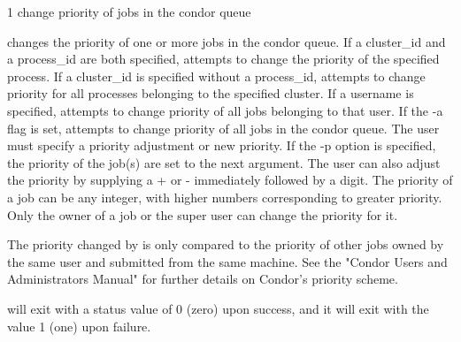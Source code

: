 \begin{ManPage}{\label{man-condor-prio}}{1}
{change priority of jobs in the condor queue} 
\Synopsis {}


\Description

 changes the priority of one or more jobs in the condor
queue.
If a cluster\_id and a process\_id are both specified, 
attempts to change the priority of the specified process.
If a cluster\_id is specified without a process\_id, 
attempts to change priority for all processes belonging to the
specified cluster.
If a username is specified,  attempts to change priority
of all jobs belonging to that user.
If the -a flag is set,  attempts to change priority of
all jobs in the condor queue.
The user must specify a priority adjustment or new priority. 
If the -p option is specified, the priority of the job(s) are set to
the next argument.
The user can also adjust the priority by supplying a + or -
immediately followed by a digit.
The priority of a job can be any integer, with higher numbers
corresponding to greater priority.
Only the owner of a job or the super user can change the priority for
it.

The priority changed by  is only compared to the priority
of other jobs owned by the same user and submitted from the same
machine.
See the "Condor Users and Administrators Manual" for further details
on Condor's priority scheme.

\begin{Options}
\end{Options}

\ExitStatus

 will exit with a status value of 0 (zero) upon success,
and it will exit with the value 1 (one) upon failure.

\end{ManPage}
